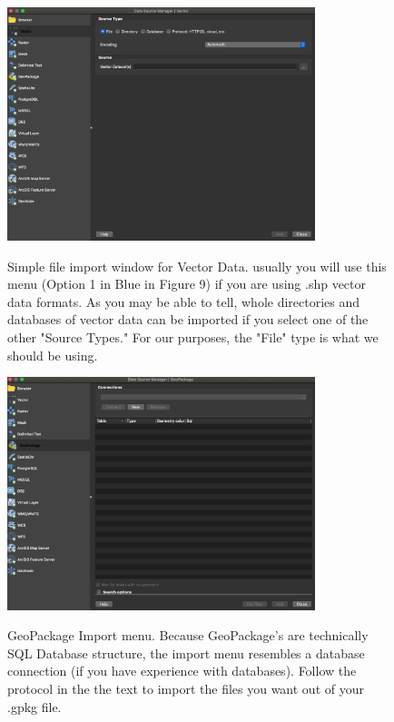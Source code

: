 \documentclass{article}
\begin{document}
\begin{figure}[htbp]
    \centering
    \includegraphics[width=0.8\textwidth]{Fig_10_Vector.png}
    \label{fig10}
    \caption{Simple file import window for Vector Data. usually you will use this menu (Option 1 in Blue in Figure 9) if you are using .shp vector data formats. As you may be able to tell, whole directories and databases of vector data can be imported if you select one of the other "Source Types." For our purposes, the "File" type is what we should be using. }
\end{figure}

\begin{figure}[htbp]
    \centering
    \includegraphics[width=0.8\textwidth]{Fig_11_Geopackage.png}
    \label{fig11}
    \caption{GeoPackage Import menu. Because GeoPackage's are technically SQL Database structure, the import menu resembles a database connection (if you have experience with databases). Follow the protocol in the the text to import the files you want out of your .gpkg file.}
\end{figure}
\end{document}
